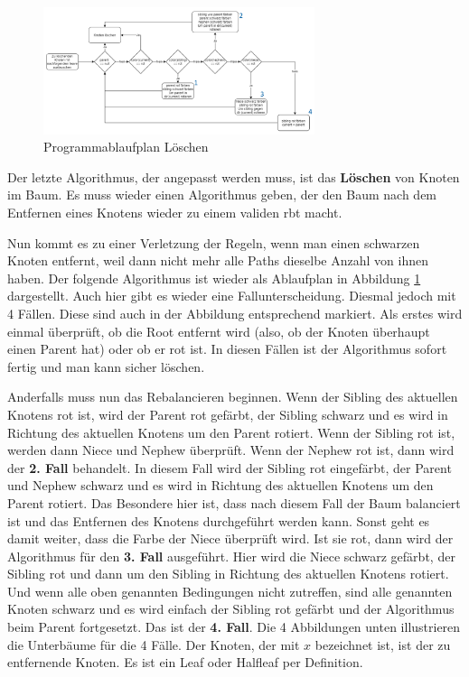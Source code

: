 \documentclass[11pt]{article}
\begin{document}
\begin{figure}
  \centering
  \includegraphics[width=300px]{prog2.png}
  \caption{Programmablaufplan Löschen}
  \label{del-tr}
\end{figure}

Der letzte Algorithmus, der angepasst werden muss, ist das \textbf{Löschen} von Knoten im Baum. Es muss wieder einen Algorithmus geben, 
der den Baum nach dem Entfernen eines Knotens wieder zu einem validen \gls{rbt} macht. 

Nun kommt es zu einer Verletzung der Regeln, wenn man einen schwarzen Knoten entfernt, weil dann nicht mehr alle Paths dieselbe Anzahl von ihnen haben. 
Der folgende Algorithmus ist wieder als Ablaufplan in Abbildung \ref{del-tr} dargestellt. 
Auch hier gibt es wieder eine Fallunterscheidung. Diesmal jedoch mit 4 Fällen. Diese sind auch in der Abbildung entsprechend markiert.
Als erstes wird einmal überprüft, ob die Root entfernt wird (also, ob der Knoten überhaupt einen Parent hat) oder ob er rot ist. In diesen Fällen ist der Algorithmus sofort fertig und man kann sicher löschen.

Anderfalls muss nun das Rebalancieren beginnen. Wenn der Sibling des aktuellen Knotens rot ist, wird der Parent rot gefärbt, der Sibling schwarz und es wird in Richtung des aktuellen Knotens um den Parent rotiert.
Wenn der Sibling rot ist, werden dann Niece und Nephew überprüft.
Wenn der Nephew rot ist, dann wird der \textbf{2. Fall} behandelt. In diesem Fall wird der Sibling rot eingefärbt, der Parent und Nephew schwarz und es wird in Richtung des aktuellen Knotens um den Parent rotiert.
Das Besondere hier ist, dass nach diesem Fall der Baum balanciert ist und das Entfernen des Knotens durchgeführt werden kann.
Sonst geht es damit weiter, dass die Farbe der Niece überprüft wird. Ist sie rot, dann wird der Algorithmus für den \textbf{3. Fall} ausgeführt. Hier wird die Niece schwarz gefärbt, der Sibling rot und dann um den Sibling in Richtung des aktuellen Knotens rotiert.
Und wenn alle oben genannten Bedingungen nicht zutreffen, sind alle genannten Knoten schwarz und es wird einfach der Sibling rot gefärbt und der Algorithmus beim Parent fortgesetzt. Das ist der \textbf{4. Fall}.
Die 4 Abbildungen unten illustrieren die Unterbäume für die 4 Fälle. Der Knoten, der mit $x$ bezeichnet ist, ist der zu entfernende Knoten. Es ist ein Leaf oder Halfleaf per Definition. 
\end{document}
